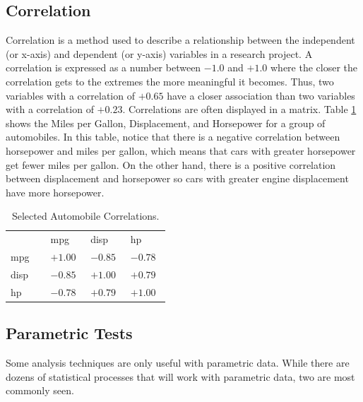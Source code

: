 \subsection{Correlation}

Correlation is a method used to describe a relationship between the independent (or x-axis) and dependent (or y-axis) variables in a research project. A correlation is expressed as a number between $ -1.0 $ and $ +1.0 $ where the closer the correlation gets to the extremes the more meaningful it becomes. Thus, two variables with a correlation of $ +0.65 $ have a closer association than two variables with a correlation of $ +0.23 $. Correlations are often displayed in a matrix. Table \ref{tab06.06} shows the Miles per Gallon, Displacement, and Horsepower for a group of automobiles. In this table, notice that there is a negative correlation between horsepower and miles per gallon, which means that cars with greater horsepower get fewer miles per gallon. On the other hand, there is a positive correlation between displacement and horsepower so cars with greater engine displacement have more horsepower.

\begin{table}[H]
	\centering
	\begin{tabularx}{0.95\linewidth}{
			p{0.22\linewidth}
			p{0.22\linewidth}
			p{0.22\linewidth}
			p{0.22\linewidth}}
		\toprule
		{}   & mpg       & disp      & hp \\
		mpg  & $ +1.00 $ & $ -0.85 $ & $ -0.78 $ \\
		disp & $ -0.85 $ & $ +1.00 $ & $ +0.79 $ \\
		hp   & $ -0.78 $ & $ +0.79 $ & $ +1.00 $ \\
		\bottomrule
	\end{tabularx}
	\caption{Selected Automobile Correlations.}
	\label{tab06.06}
\end{table}


\subsection{Parametric Tests}

Some analysis techniques are only useful with \gls{parametric} data. While there are dozens of statistical processes that will work with parametric data, two are most commonly seen.

